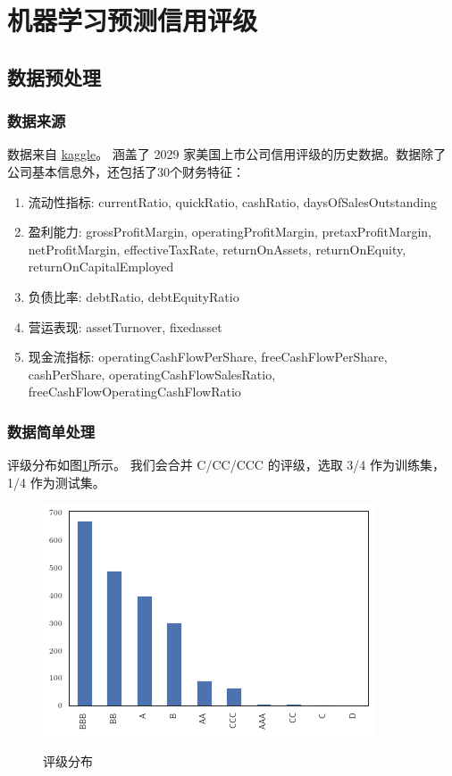 \documentclass[mathserif,envcountsect,fontset=mac]{ctexbeamer}
\begin{document}
\section{机器学习预测信用评级}
\subsection{数据预处理}
\begin{frame}
    \frametitle{数据来源}
    数据来自 \href{https://www.kaggle.com/datasets/agewerc/corporate-credit-rating}{kaggle}。
    涵盖了 2029 家美国上市公司信用评级的历史数据。数据除了公司基本信息外，还包括了30个财务特征：

    \begin{enumerate}
        \item 流动性指标: currentRatio, quickRatio, cashRatio, daysOfSalesOutstanding
        \item 盈利能力: grossProfitMargin, operatingProfitMargin, pretaxProfitMargin, netProfitMargin, effectiveTaxRate, returnOnAssets, returnOnEquity, returnOnCapitalEmployed
        \item 负债比率: debtRatio, debtEquityRatio
        \item 营运表现: assetTurnover, fixedasset
        \item 现金流指标: operatingCashFlowPerShare, freeCashFlowPerShare, cashPerShare, operatingCashFlowSalesRatio, freeCashFlowOperatingCashFlowRatio
    \end{enumerate}
\end{frame}
\begin{frame}[fragile]
    \frametitle{数据简单处理}
    评级分布如图\ref{rating}所示。
    我们会合并 C/CC/CCC 的评级，选取 3/4 作为训练集，1/4 作为测试集。
    \begin{figure}
        \includegraphics[width=0.6\linewidth]{../lib/rating.png}
        \label{rating}
        \caption{评级分布}
    \end{figure}
\end{frame}
\end{document}
